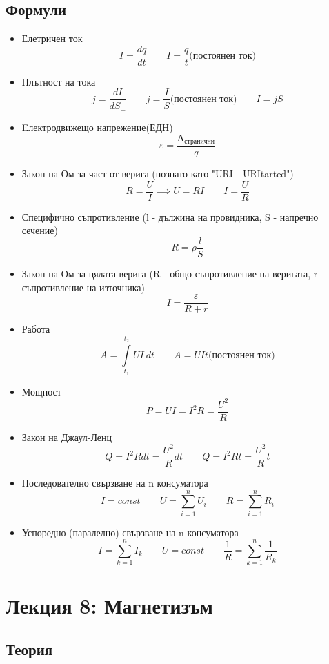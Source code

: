 \documentclass[fleqn, 12pt]{article}
\theoremstyle{definition}
\begin{document}
\subsection{Формули}
\begin{itemize}
\item Елетричен ток 
$$I = \frac{dq}{dt} \qquad I = \frac{q}{t} \text{(постоянен ток)}$$
\item Плътност на тока 
$$j = \frac{dI}{dS_{\perp}} \qquad j = \frac{I}{S} \text{(постоянен ток)} \qquad I = jS$$
\item Eлектродвижещо напрежение(ЕДН) 
$$\varepsilon = \frac{А_{\text{странични}}}{q}$$
\item Закон на Ом за част от верига (познато като "URI - URItarted")
$$R = \frac{U}{I} \implies U=RI \qquad I = \frac{U}{R}$$
\item Специфично съпротивление (l - дължина на провидника, S - напречно сечение)
$$R = \rho \frac{l}{S}$$
\item Закон на Ом за цялата верига (R - общо съпротивление на веригата, r - съпротивление на източника)
$$I = \frac{\varepsilon}{R + r}$$
\item Работа 
$$A = \int\limits_{t_1} ^{t_2} UI \ dt \qquad A = UIt \text{(постоянен ток)}$$
\item Мощност
$$P = UI = I^2R = \frac{U^2}{R}$$
\item Закон на Джаул-Ленц
$$Q = I^2Rdt = \frac{U^2}{R} dt \qquad Q = I^2Rt = \frac{U^2}{R}t $$
\item Последователно свързване на n консуматора
$$I = const \qquad U = \sum_{i=1} ^n U_i  \qquad R = \sum_{i=1} ^n R_i$$
\item Успоредно (паралелно) свързване на n консуматора 
$$I = \sum_{k=1} ^n I_k \qquad U = const \qquad \frac{1}{R} = \sum_{k=1} ^n \frac{1}{R_k}$$
\end{itemize}

\newpage
\section{Лекция 8: Магнетизъм}

\subsection{Теория}
\end{document}
